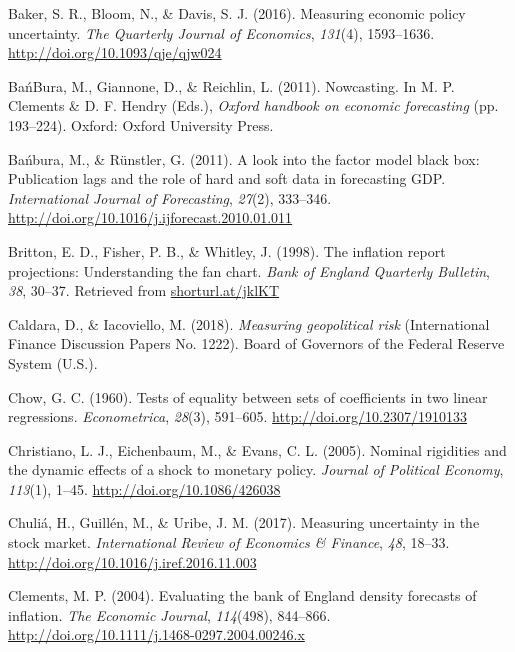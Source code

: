 \documentclass[12pt,twoside]{reedthesis}
\begin{document}
\leavevmode\hypertarget{ref-bakebloodavi:2016}{}%
Baker, S. R., Bloom, N., \& Davis, S. J. (2016). Measuring economic policy uncertainty. \emph{The Quarterly Journal of Economics}, \emph{131}(4), 1593--1636. \url{http://doi.org/10.1093/qje/qjw024}

\leavevmode\hypertarget{ref-banbgianreic:2011}{}%
BańBura, M., Giannone, D., \& Reichlin, L. (2011). Nowcasting. In M. P. Clements \& D. F. Hendry (Eds.), \emph{Oxford handbook on economic forecasting} (pp. 193--224). Oxford: Oxford University Press.

\leavevmode\hypertarget{ref-banbruns:2011}{}%
Bańbura, M., \& Rünstler, G. (2011). A look into the factor model black box: Publication lags and the role of hard and soft data in forecasting GDP. \emph{International Journal of Forecasting}, \emph{27}(2), 333--346. \url{http://doi.org/10.1016/j.ijforecast.2010.01.011}

\leavevmode\hypertarget{ref-britfishwhit:1998}{}%
Britton, E. D., Fisher, P. B., \& Whitley, J. (1998). The inflation report projections: Understanding the fan chart. \emph{Bank of England Quarterly Bulletin}, \emph{38}, 30--37. Retrieved from \url{shorturl.at/jklKT}

\leavevmode\hypertarget{ref-caldiaco:2018}{}%
Caldara, D., \& Iacoviello, M. (2018). \emph{Measuring geopolitical risk} (International Finance Discussion Papers No. 1222). Board of Governors of the Federal Reserve System (U.S.).

\leavevmode\hypertarget{ref-chow:1960}{}%
Chow, G. C. (1960). Tests of equality between sets of coefficients in two linear regressions. \emph{Econometrica}, \emph{28}(3), 591--605. \url{http://doi.org/10.2307/1910133}

\leavevmode\hypertarget{ref-chrieichevan:2005}{}%
Christiano, L. J., Eichenbaum, M., \& Evans, C. L. (2005). Nominal rigidities and the dynamic effects of a shock to monetary policy. \emph{Journal of Political Economy}, \emph{113}(1), 1--45. \url{http://doi.org/10.1086/426038}

\leavevmode\hypertarget{ref-chulguilurib:2017}{}%
Chuliá, H., Guillén, M., \& Uribe, J. M. (2017). Measuring uncertainty in the stock market. \emph{International Review of Economics \& Finance}, \emph{48}, 18--33. \url{http://doi.org/10.1016/j.iref.2016.11.003}

\leavevmode\hypertarget{ref-clements:2004}{}%
Clements, M. P. (2004). Evaluating the bank of England density forecasts of inflation. \emph{The Economic Journal}, \emph{114}(498), 844--866. \url{http://doi.org/10.1111/j.1468-0297.2004.00246.x}
\end{document}
